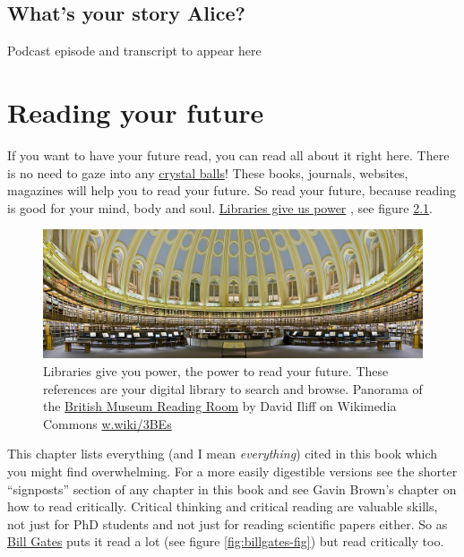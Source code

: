 \documentclass[
]{book}
\begin{document}
\hypertarget{alice-story}{%
\section{What's your story Alice?}\label{alice-story}}

Podcast episode and transcript to appear here

\hypertarget{reading}{%
\chapter{Reading your future}\label{reading}}

If you want to have your future read, you can read all about it right here. There is no need to gaze into any \href{https://en.wikipedia.org/wiki/Crystal_ball}{crystal balls}! These books, journals, websites, magazines will help you to read your future. So read your future, because reading is good for your mind, body and soul. \href{https://en.wikipedia.org/wiki/A_Design_for_Life}{Libraries give us power} \citep{librariesgiveuspower}, see figure \ref{fig:library-power-fig}.

\begin{figure}

{\centering \includegraphics[width=1\linewidth]{images/Libraries_Give_Us_Power} 

}

\caption{Libraries give you power, the power to read your future. These references are your digital library to search and browse. Panorama of the \href{https://en.wikipedia.org/wiki/British_Museum_Reading_Room}{British Museum Reading Room} by David Iliff on Wikimedia Commons \href{https://w.wiki/3BEs}{w.wiki/3BEs}}\label{fig:library-power-fig}
\end{figure}



This chapter lists everything (and I mean \emph{everything}) cited in this book which you might find overwhelming. For a more easily digestible versions see the shorter ``signposts'' section of any chapter in this book and see Gavin Brown's chapter on how to read critically. Critical thinking and critical reading are valuable skills, not just for PhD students and not just for reading scientific papers either. So as \href{https://en.wikipedia.org/wiki/Bill_Gates}{Bill Gates} puts it read a lot (see figure \ref{fig:billgates-fig}) but read critically too. \citep{howtoread}
\end{document}
